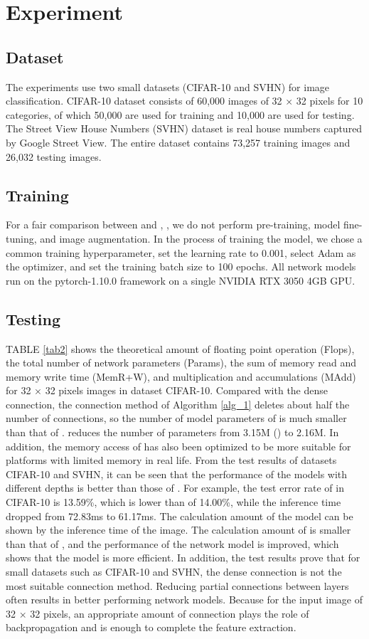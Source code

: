 \documentclass[conference]{IEEEtran}
\begin{document}
\section{Experiment}
\subsection{Dataset}
The experiments use two small datasets (CIFAR-10 and SVHN) for image classification. CIFAR-10 \cite{krizhevsky2009learning} dataset consists of 60,000 images of 32 × 32 pixels for 10 categories, of which 50,000 are used for training and 10,000 are used for testing. The Street View House Numbers (SVHN) \cite{netzer2011reading} dataset is real house numbers captured by Google Street View. The entire dataset contains 73,257 training images and 26,032 testing images.

\subsection{Training}
For a fair comparison between  and , , we do not perform pre-training, model fine-tuning, and image augmentation.  In the process of training the model, we chose a common training hyperparameter, set the learning rate to 0.001, select Adam as the optimizer, and set the training batch size to 100 epochs. All network models run on the pytorch-1.10.0 framework on a single NVIDIA RTX 3050 4GB GPU.

\subsection{Testing}
TABLE \ref{tab2} shows the theoretical amount of floating point operation (Flops), the total number of network parameters (Params), the sum of memory read and memory write time (MemR+W), and multiplication and accumulations (MAdd) for 32 × 32 pixels images in dataset CIFAR-10. Compared with the dense connection, the connection method of Algorithm \ref{alg_1} deletes about half the number of connections, so the number of model parameters of  is much smaller than that of .  reduces the number of parameters from 3.15M  () to 2.16M. In addition, the memory access of  has also been optimized to be more suitable for platforms with limited memory in real life. From the test results of datasets CIFAR-10 and SVHN, it can be seen that the performance of the  models with different depths is better than those of . For example, the test error rate of  in CIFAR-10 is 13.59\%, which is lower than  of 14.00\%, while the inference time dropped from 72.83ms to 61.17ms. The calculation amount of the model can be shown by the inference time of the image. The calculation amount of  is smaller than that of , and the performance of the network model is improved, which shows that the  model is more efficient. In addition, the test results prove that for small datasets such as CIFAR-10 and SVHN, the dense connection is not the most suitable connection method. Reducing partial connections between layers often results in better performing network models.  Because for the input image of 32 × 32 pixels, an appropriate amount of connection plays the role of backpropagation and is enough to complete the feature extraction.
\end{document}
